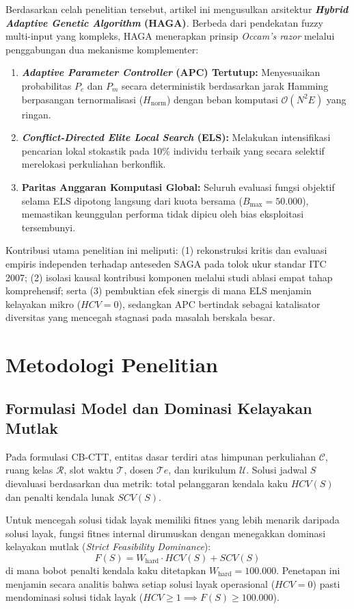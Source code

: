 \documentclass[journal]{IEEEtran}
\begin{document}
Berdasarkan celah penelitian tersebut, artikel ini mengusulkan arsitektur \textbf{\textit{Hybrid Adaptive Genetic Algorithm} (HAGA)}. Berbeda dari pendekatan fuzzy multi-input yang kompleks, HAGA menerapkan prinsip \textit{Occam's razor} melalui penggabungan dua mekanisme komplementer:
\begin{enumerate}
    \item \textbf{\textit{Adaptive Parameter Controller} (APC) Tertutup:} Menyesuaikan probabilitas $P_c$ dan $P_m$ secara deterministik berdasarkan jarak Hamming berpasangan ternormalisasi ($H_{\text{norm}}$) dengan beban komputasi $\mathcal{O}(N^2 E)$ yang ringan.
    \item \textbf{\textit{Conflict-Directed Elite Local Search} (ELS):} Melakukan intensifikasi pencarian lokal stokastik pada 10\% individu terbaik yang secara selektif merelokasi perkuliahan berkonflik.
    \item \textbf{Paritas Anggaran Komputasi Global:} Seluruh evaluasi fungsi objektif selama ELS dipotong langsung dari kuota bersama ($B_{\max} = 50.000$), memastikan keunggulan performa tidak dipicu oleh bias eksploitasi tersembunyi.
\end{enumerate}

Kontribusi utama penelitian ini meliputi: (1) rekonstruksi kritis dan evaluasi empiris independen terhadap anteseden SAGA pada tolok ukur standar ITC 2007; (2) isolasi kausal kontribusi komponen melalui studi ablasi empat tahap komprehensif; serta (3) pembuktian efek sinergis di mana ELS menjamin kelayakan mikro ($HCV=0$), sedangkan APC bertindak sebagai katalisator diversitas yang mencegah stagnasi pada masalah berskala besar.

\section{Metodologi Penelitian}

\subsection{Formulasi Model dan Dominasi Kelayakan Mutlak}
Pada formulasi CB-CTT, entitas dasar terdiri atas himpunan perkuliahan $\mathcal{C}$, ruang kelas $\mathcal{R}$, slot waktu $\mathcal{T}$, dosen $\mathcal{T}e$, dan kurikulum $\mathcal{U}$. Solusi jadwal $S$ dievaluasi berdasarkan dua metrik: total pelanggaran kendala kaku $HCV(S)$ dan penalti kendala lunak $SCV(S)$.

Untuk mencegah solusi tidak layak memiliki fitnes yang lebih menarik daripada solusi layak, fungsi fitnes internal dirumuskan dengan menegakkan dominasi kelayakan mutlak (\textit{Strict Feasibility Dominance}):
\begin{equation}
F(S) = W_{\text{hard}} \cdot HCV(S) + SCV(S)
\end{equation}
di mana bobot penalti kendala kaku ditetapkan $W_{\text{hard}} = 100.000$. Penetapan ini menjamin secara analitis bahwa setiap solusi layak operasional ($HCV=0$) pasti mendominasi solusi tidak layak ($HCV \ge 1 \implies F(S) \ge 100.000$).
\end{document}
